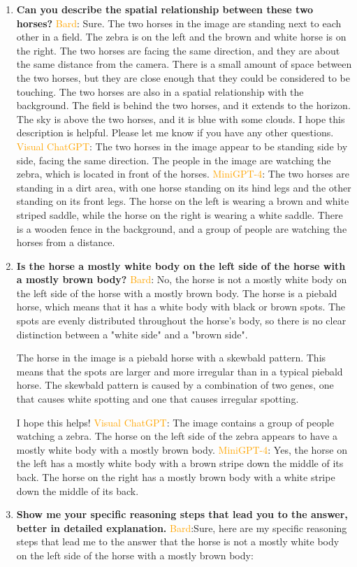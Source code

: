     \begin{enumerate}
        \item \textbf{Can you describe the spatial relationship between these two horses?}
        \subitem \textcolor{orange}{Bard}: 
        Sure. The two horses in the image are standing next to each other in a field. The zebra is on the left and the brown and white horse is on the right. The two horses are facing the same direction, and they are about the same distance from the camera. There is a small amount of space between the two horses, but they are close enough that they could be considered to be touching.
        The two horses are also in a spatial relationship with the background. The field is behind the two horses, and it extends to the horizon. The sky is above the two horses, and it is blue with some clouds.
        I hope this description is helpful. Please let me know if you have any other questions.
        \subitem \textcolor{orange}{Visual ChatGPT}: The two horses in the image appear to be standing side by side, facing the same direction. The people in the image are watching the zebra, which is located in front of the horses.
        \subitem \textcolor{orange}{MiniGPT-4}: The two horses are standing in a dirt area, with one horse standing on its hind legs and the other standing on its front legs. The horse on the left is wearing a brown and white striped saddle, while the horse on the right is wearing a white saddle. There is a wooden fence in the background, and a group of people are watching the horses from a distance.
        \item \textbf{Is the horse a mostly white body on the left side of the horse with a mostly brown body?}
        \subitem \textcolor{orange}{Bard}: 
        No, the horse is not a mostly white body on the left side of the horse with a mostly brown body. The horse is a piebald horse, which means that it has a white body with black or brown spots. The spots are evenly distributed throughout the horse's body, so there is no clear distinction between a "white side" and a "brown side".

        The horse in the image is a piebald horse with a skewbald pattern. This means that the spots are larger and more irregular than in a typical piebald horse. The skewbald pattern is caused by a combination of two genes, one that causes white spotting and one that causes irregular spotting.

        I hope this helps!
        \subitem \textcolor{orange}{Visual ChatGPT}: The image contains a group of people watching a zebra. The horse on the left side of the zebra appears to have a mostly white body with a mostly brown body.
        \subitem \textcolor{orange}{MiniGPT-4}: Yes, the horse on the left has a mostly white body with a brown stripe down the middle of its back. The horse on the right has a mostly brown body with a white stripe down the middle of its back.
        \item \textbf{Show me your specific reasoning steps that lead you to the answer, better in detailed explanation.}
        \subitem \textcolor{orange}{Bard}:Sure, here are my specific reasoning steps that lead me to the answer that the horse is not a mostly white body on the left side of the horse with a mostly brown body:


\end{enumerate}
